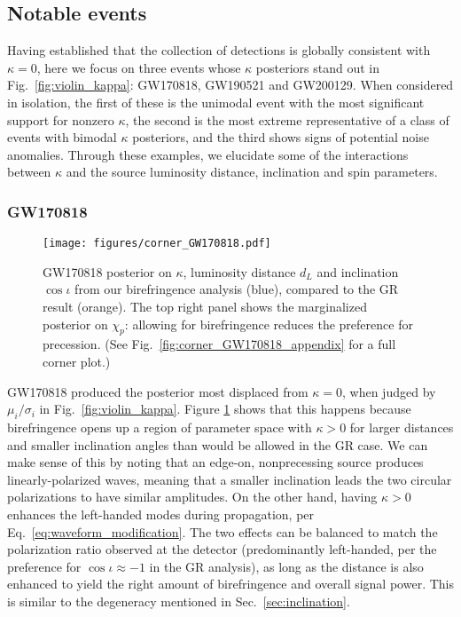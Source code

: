 \documentclass[aps,prd,twocolumn,superscriptaddress,preprintnumbers,nofootinbib]{revtex4-2}
\begin{document}
\subsection{Notable events}
\label{sec:results:notable}

Having established that the collection of detections is globally consistent with $\kappa=0$, here we focus on three events whose $\kappa$ posteriors stand out in Fig.~\ref{fig:violin_kappa}: GW170818, GW190521 and GW200129.
When considered in isolation, the first of these is the unimodal event with the most significant support for nonzero $\kappa$, the second is the most extreme representative of a class of events with bimodal $\kappa$ posteriors, and the third shows signs of potential noise anomalies.
Through these examples, we elucidate some of the interactions between $\kappa$ and the source luminosity distance, inclination and spin parameters.

\subsubsection{GW170818}
\label{sec:GW170818}

\begin{figure}
    \texttt{[image: figures/corner\_GW170818.pdf]}
    \caption{
        GW170818 posterior on $\kappa$, luminosity distance $d_L$ and inclination $\cos\iota$ from our birefringence analysis (blue), compared to the GR result (orange).
        The top right panel shows the marginalized posterior on $\chi_p$: allowing for birefringence reduces the preference for precession.
        (See Fig.~\ref{fig:corner_GW170818_appendix} for a full corner plot.)
    }
    \label{fig:corner_GW170818}
\end{figure}

GW170818 produced the posterior most displaced from $\kappa=0$, when judged by $\mu_i/\sigma_i$ in Fig.~\ref{fig:violin_kappa}.
Figure \ref{fig:corner_GW170818} shows that this happens because birefringence opens up a region of parameter space with $\kappa>0$ for larger distances and smaller inclination angles than would be allowed in the GR case.
We can make sense of this by noting that an edge-on, nonprecessing source produces linearly-polarized waves, meaning that a smaller inclination leads the two circular polarizations to have similar amplitudes.
On the other hand, having $\kappa > 0$ enhances the left-handed modes during propagation, per Eq.~\eqref{eq:waveform_modification}.
The two effects can be balanced to match the polarization ratio observed at the detector (predominantly left-handed, per the preference for $\cos\iota \approx -1$ in the \ac{GR} analysis), as long as the distance is also enhanced to yield the right amount of birefringence and overall signal power.
This is similar to the degeneracy mentioned in Sec.~\ref{sec:inclination}.
\end{document}
